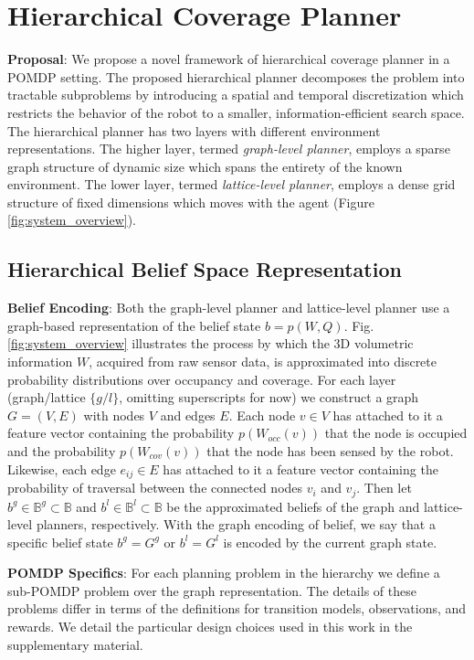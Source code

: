 \documentclass{article}
\newcommand{\ph}[1]{{\textbf{#1}:}} %
\begin{document}
\section{Hierarchical Coverage Planner}

\ph{Proposal} We propose a novel framework of hierarchical coverage planner in a POMDP setting. The proposed hierarchical planner decomposes the problem into tractable subproblems by introducing a spatial and temporal discretization which restricts the behavior of the robot to a smaller, information-efficient search space. The hierarchical planner has two layers with different environment representations.  The higher layer, termed \emph{graph-level planner}, employs a sparse graph structure of dynamic size which spans the entirety of the known environment. The lower layer, termed \emph{lattice-level planner}, employs a dense grid structure of fixed dimensions which moves with the agent (Figure \ref{fig:system_overview}).  

\subsection{Hierarchical Belief Space Representation} 

\ph{Belief Encoding} Both the graph-level planner and lattice-level planner use a graph-based representation of the belief state $b=p(W,Q)$. Fig. \ref{fig:system_overview} illustrates the process by which the 3D volumetric information $W$, acquired from raw sensor data, is approximated into discrete probability distributions over occupancy and coverage. For each layer (graph/lattice $\{g/l\}$, omitting superscripts for now) we construct a graph $G=(V,E)$ with nodes $V$ and edges $E$.  Each node $v \in V$ has attached to it a feature vector containing the probability $p(W_{occ}(v))$ that the node is occupied and the probability $p(W_{cov}(v))$ that the node has been sensed by the robot.  Likewise, each edge $e_{ij} \in E$ has attached to it a feature vector containing the probability of traversal between the connected nodes $v_i$ and $v_j$.  Then let $b^g\in\mathbb{B}^g\subset\mathbb{B}$ and $b^l\in\mathbb{B}^l\subset\mathbb{B}$ be the approximated beliefs of the graph and lattice-level planners, respectively.  With the graph encoding of belief, we say that a specific belief state $b^g=G^g$ or $b^l=G^l$ is encoded by the current graph state.

\ph{POMDP Specifics} For each planning problem in the hierarchy we define a sub-POMDP problem over the graph representation.  The details of these problems differ in terms of the definitions for transition models, observations, and rewards.  We detail the particular design choices used in this work in the supplementary material.
\end{document}
